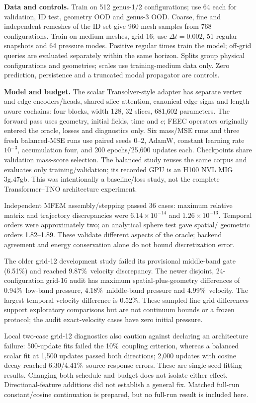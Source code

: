 \documentclass[10pt,a4paper]{article}
\newcommand{\pct}{\%}
\begin{document}
\textbf{Data and controls.} Train on 512 genus-1/2 configurations; use 64 each for
validation, ID test, geometry OOD and genus-3 OOD. Coarse, fine and independent
remeshes of the ID set give 960 mesh samples from 768 configurations. Train on
medium meshes, grid 16; use $\Delta t=0.002$, 51 regular snapshots and 64 pressure
modes. Positive regular times train the model; off-grid queries are evaluated
separately within the same horizon. Splits group physical configurations and
geometries; scales use training-medium data only. Zero prediction, persistence
and a truncated modal propagator are controls.

\textbf{Model and budget.} The scalar Transolver-style adapter has separate vertex
and edge encoders/heads, shared slice attention, canonical edge signs and
length-aware cochains: four blocks, width 128, 32 slices, 681,602 parameters.
The forward pass uses geometry, initial fields, time and $c$; FEEC operators
originally entered the oracle, losses and diagnostics only. Six mass/MSE runs
and three fresh balanced-MSE runs use paired seeds 0--2, AdamW, constant
learning rate $10^{-3}$, accumulation four, and 200 epochs/25,600 updates each.
Checkpoints share validation mass-score selection. The balanced study reuses the
same corpus and evaluates only training/validation; its recorded GPU is an H100
NVL MIG 3g.47gb. This was intentionally a baseline/loss study, not the complete
Transformer--TNO architecture experiment.


Independent MFEM assembly/stepping passed 36 cases: maximum relative matrix and
trajectory discrepancies were $6.14\times10^{-14}$ and $1.26\times10^{-13}$.
Temporal orders were approximately two; an analytical sphere test gave spatial/
geometric orders 1.82--1.89. These validate different aspects of the oracle;
backend agreement and energy conservation alone do not bound discretization error.

The older grid-12 development study failed its provisional middle-band gate
(6.51\pct) and reached 9.87\pct\ velocity discrepancy. The newer disjoint,
24-configuration grid-16 audit has maximum spatial-plus-geometry differences
of 0.94\pct\ low-band pressure, 4.18\pct\ middle-band pressure and 4.99\pct\ velocity.
The largest temporal velocity difference is 0.52\pct. These sampled fine-grid
differences support exploratory comparisons but are not continuum bounds or a
frozen protocol; the audit exact-velocity cases have zero initial pressure.

Local two-case grid-12 diagnostics also caution against declaring an architecture
failure: 500-update fits failed the 10\pct\ coupling criterion, whereas a balanced
scalar fit at 1,500 updates passed both directions; 2,000 updates with cosine
decay reached 6.30/4.41\pct\ source-response errors. These are single-seed fitting
results. Changing both schedule and budget does not isolate either effect.
Directional-feature additions did not establish a general fix. Matched full-run
constant/cosine continuation is prepared, but no full-run result is included here.
\end{document}
